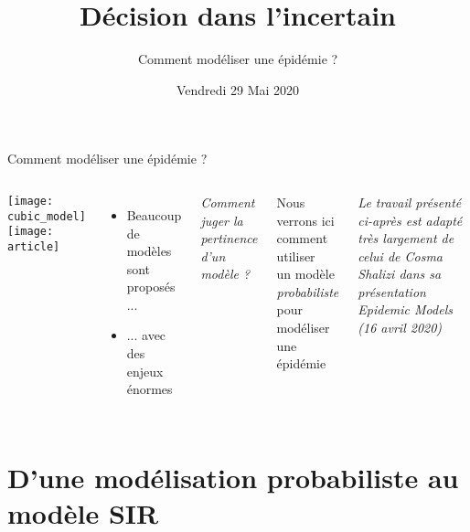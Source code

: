 \documentclass[10pt]{beamer}
\title{Décision dans l'incertain}
\subtitle{Comment modéliser une épidémie ?}
\date{Vendredi 29 Mai 2020}
\begin{document}
\begin{frame}
  \maketitle
\end{frame}

\begin{frame}{Comment modéliser une épidémie ?}
  \begin{columns}
    \texttt{[image: cubic\_model]}
    \texttt{[image: article]}
    \begin{itemize}
      \item Beaucoup de modèles sont proposés ...
      \item ... avec des enjeux énormes
    \end{itemize}
    \emph{Comment juger la pertinence d'un modèle ?}

    \vspace{.5cm}

    \pause
    \alert{Nous verrons ici comment utiliser \\
    un modèle \emph{probabiliste} pour modéliser
    une épidémie}

    \vspace{.5cm}

    \emph{Le travail présenté ci-après est adapté très largement
      de celui de Cosma Shalizi dans sa présentation \emph{Epidemic Models}
      (16 avril 2020)
    }
  \end{columns}
\end{frame}

\section{D'une modélisation probabiliste au modèle SIR}
\end{document}
